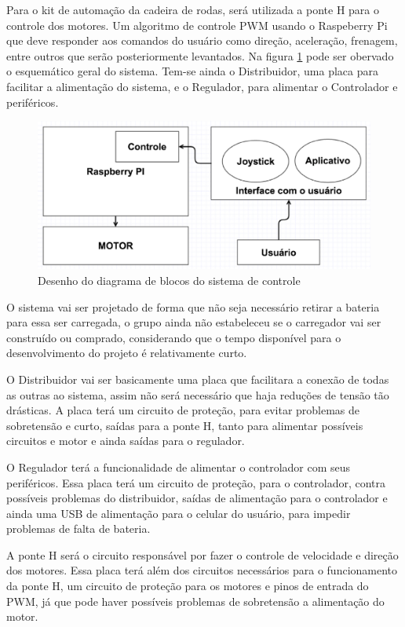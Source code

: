 Para o kit de automação da cadeira de rodas, será utilizada a ponte H para o controle dos motores. Um algoritmo de controle PWM usando o Raspeberry Pi que deve responder aos comandos do usuário como direção, aceleração, frenagem, entre outros que serão posteriormente levantados. Na figura \ref{fig:diagrama_blocos} pode ser obervado o esquemático geral do sistema. Tem-se ainda o Distribuidor, uma placa para facilitar a alimentação do sistema, e o Regulador, para alimentar o Controlador e periféricos.

\begin{figure}[!htb]
\centering
  \includegraphics[keepaspectratio=true,scale=0.6]{figuras/controle/diagrama_blocos}
\caption{Desenho do diagrama de blocos do sistema de controle}
\label{fig:diagrama_blocos}
\end{figure}

O sistema vai ser projetado de forma que não seja necessário retirar a bateria para essa ser carregada, o grupo ainda não estabeleceu se o carregador vai ser construído ou comprado, considerando que o tempo disponível para o desenvolvimento do projeto é relativamente curto.

O Distribuidor vai ser basicamente uma placa que facilitara a conexão de todas as outras ao sistema, assim não será necessário que haja reduções de tensão tão drásticas. A placa terá um circuito de proteção, para evitar problemas de sobretensão e curto, saídas para a ponte H, tanto para alimentar possíveis circuitos e motor e ainda saídas para o regulador.

O Regulador terá a funcionalidade de alimentar o controlador com seus periféricos. Essa placa terá um circuito de proteção, para o controlador, contra possíveis problemas do distribuidor, saídas de alimentação para o controlador e ainda uma USB de alimentação para o celular do usuário, para impedir problemas de falta de bateria.

A ponte H será o circuito responsável por fazer o controle de velocidade e direção dos motores. Essa placa terá além dos circuitos necessários para o funcionamento da ponte H, um circuito de proteção para os motores e pinos de entrada do PWM, já que pode haver possíveis problemas de sobretensão a alimentação do motor.


